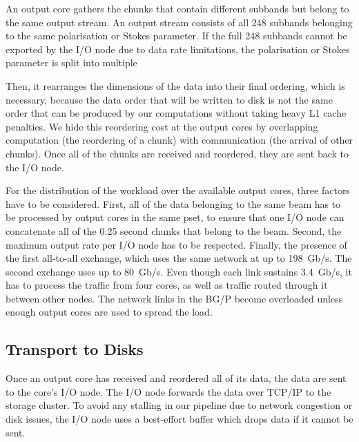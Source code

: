 \documentclass{llncs}
\begin{document}
An output core gathers the chunks that contain different subbands but belong to the same output stream. An output stream consists of all 248 subbands belonging to the same polarisation or Stokes parameter. If the full 248 subbands cannot be exported by the I/O node due to data rate limitations, the polarisation or Stokes parameter is split into multiple 

Then, it rearranges the dimensions of the data into their final ordering, which is necessary, because the data order that will be written to disk is not the same order that can be produced by our computations without taking heavy L1 cache penalties. We hide this reordering cost at the output cores by overlapping computation (the reordering of a chunk) with communication (the arrival of other chunks). Once all of the chunks are received and reordered, they are sent back to the I/O node.

For the distribution of the workload over the available output cores, three factors have to be considered. First, all of the data belonging to the same beam has to be processed by output cores in the same pset, to ensure that one I/O node can concatenate all of the 0.25 second chunks that belong to the beam. Second, the maximum output rate per I/O node has to be respected. Finally, the presence of the first all-to-all exchange, which uses the same network at up to 198~Gb/s. The second exchange uses up to 80~Gb/s. Even though each link sustains 3.4~Gb/s, it has to process the traffic from four cores, as well as traffic routed through it between other nodes. The network links in the BG/P become overloaded unless enough output cores are used to spread the load.

\subsection{Transport to Disks}
Once an output core has received and reordered all of its data, the data are sent to the core's I/O node. The I/O node forwards the data over TCP/IP to the storage cluster. To avoid any stalling in our pipeline due to network congestion or disk issues, the I/O node uses a best-effort buffer which drops data if it cannot be sent.

\end{document}
